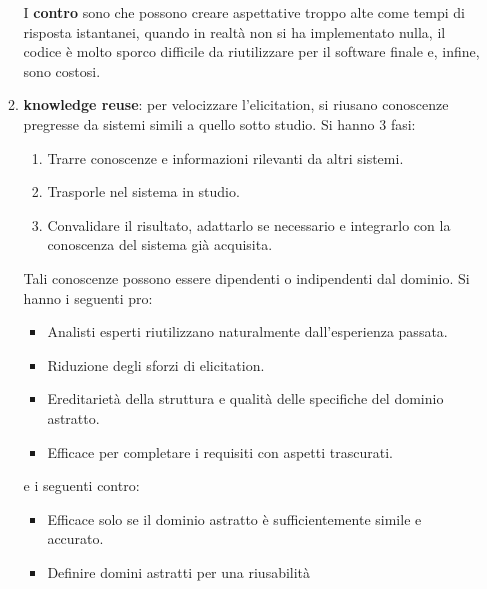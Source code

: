 \begin{itemize}
\begin{enumerate}
                        I \textbf{contro} sono che possono creare aspettative
                        troppo alte come tempi di risposta istantanei, quando in
                        realtà non si ha implementato nulla, il codice è molto
                        sporco difficile da riutilizzare per il software finale
                        e, infine, sono costosi.
                  \item \textbf{knowledge reuse}: per velocizzare l'elicitation,
                        si riusano conoscenze pregresse da sistemi simili a quello
                        sotto studio. Si hanno 3 fasi:
                        \begin{enumerate}
                              \item Trarre conoscenze e informazioni rilevanti
                                    da altri sistemi.
                              \item Trasporle nel sistema in studio.
                              \item Convalidare il risultato, adattarlo se
                                    necessario e integrarlo con la conoscenza del
                                    sistema già acquisita.
                        \end{enumerate}
                        Tali conoscenze possono essere dipendenti o indipendenti
                        dal dominio. Si hanno i seguenti pro:
                        \begin{itemize}
                              \item Analisti esperti riutilizzano naturalmente
                                    dall'esperienza passata.
                              \item Riduzione degli sforzi di elicitation.
                              \item Ereditarietà della struttura e qualità delle
                                    specifiche del dominio astratto.
                              \item Efficace per completare i requisiti con aspetti
                                    trascurati.
                        \end{itemize}
                        e i seguenti contro:
                        \begin{itemize}
                              \item Efficace solo se il dominio astratto è
                                    sufficientemente simile e accurato.
                              \item Definire domini astratti per una riusabilità

\end{itemize}
\end{enumerate}
\end{itemize}
